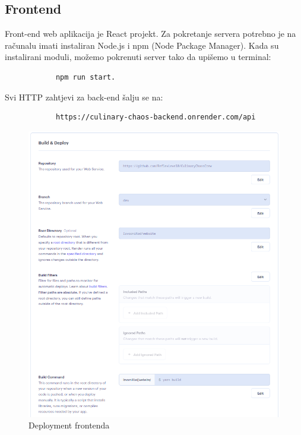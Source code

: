 			\subsection*{Frontend}
			Front-end web aplikacija je React projekt. Za pokretanje servera potrebno je na računalu imati instaliran Node.js i npm (Node Package Manager). Kada su instalirani moduli, možemo pokrenuti server tako da upišemo u terminal:
			\begin{verbatim}
			npm run start.
			\end{verbatim}
			Svi HTTP zahtjevi za back-end šalju se na:
			\begin{verbatim}
			https://culinary-chaos-backend.onrender.com/api
			\end{verbatim}
			\begin{figure}[H]
				\centering
				\includegraphics[width=1\textwidth]{slike/web.png}
				\caption{Deployment frontenda}
				\label{fig:enter-label}
			\end{figure}
			
			
			\eject 